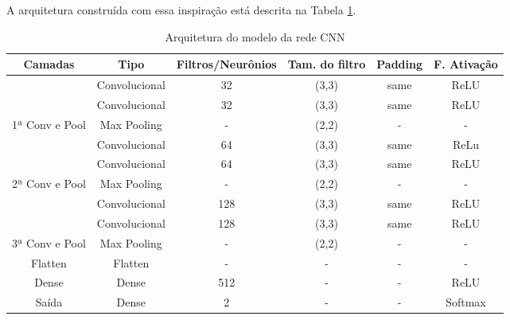 \documentclass[]{abntex2}
\begin{document}
A arquitetura construída com essa inspiração está descrita na Tabela \ref{tab:arquiCNN}.

\begin{table}[H]
    \centering
    \begin{tabular}{|c|c|c|c|c|c|}
    \hline
    \rowcolor[HTML]{C0C0C0} 
    Camadas                                                  & Tipo          & Filtros/Neurônios & Tam. do filtro & Padding & F. Ativação \\ \hline
    \cellcolor[HTML]{C0C0C0}                                 & Convolucional & 32                   & (3,3)             & same    & ReLU        \\ \cline{2-6} 
    \cellcolor[HTML]{C0C0C0}                                 & Convolucional & 32                   & (3,3)             & same    & ReLU        \\ \cline{2-6} 
    \multirow{-3}{*}{\cellcolor[HTML]{C0C0C0}1ª Conv e Pool} & Max Pooling   & -                    & (2,2)             & -       & -           \\ \hline
    \cellcolor[HTML]{C0C0C0}                                 & Convolucional & 64                   & (3,3)             & same    & ReLu        \\ \cline{2-6} 
    \cellcolor[HTML]{C0C0C0}                                 & Convolucional & 64                   & (3,3)             & same    & ReLU        \\ \cline{2-6} 
    \multirow{-3}{*}{\cellcolor[HTML]{C0C0C0}2ª Conv e Pool} & Max Pooling   & -                    & (2,2)             & -       & -           \\ \hline
    \cellcolor[HTML]{C0C0C0}                                 & Convolucional & 128                  & (3,3)             & same    & ReLU        \\ \cline{2-6} 
    \cellcolor[HTML]{C0C0C0}                                 & Convolucional & 128                  & (3,3)             & same    & ReLU        \\ \cline{2-6} 
    \multirow{-3}{*}{\cellcolor[HTML]{C0C0C0}3ª Conv e Pool} & Max Pooling   & -                    & (2,2)             & -       & -           \\ \hline
    \cellcolor[HTML]{C0C0C0}Flatten                          & Flatten       & -                    & -                 & -       & -           \\ \hline
    \cellcolor[HTML]{C0C0C0}Dense                            & Dense         & 512                  & -                 & -       & ReLU        \\ \hline
    \cellcolor[HTML]{C0C0C0}Saída                            & Dense         & 2                    & -                 & -       & Softmax     \\ \hline
    \end{tabular}
    \caption{Arquitetura do modelo da rede CNN}
    \label{tab:arquiCNN}

\end{table}
\end{document}
